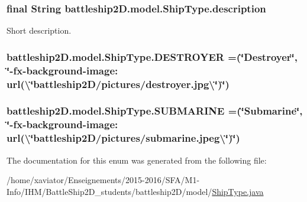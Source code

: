 \hypertarget{enumbattleship2D_1_1model_1_1ShipType_a99b2dcefbf9c3c0c210d2f7760d247ef}{
\subsubsection[{description}]{\setlength{\rightskip}{0pt plus 5cm}final String battleship2\-D.\-model.\-Ship\-Type.\-description\hspace{0.3cm}{\ttfamily [private]}}}\label{enumbattleship2D_1_1model_1_1ShipType_a99b2dcefbf9c3c0c210d2f7760d247ef}


Short description. 

\hypertarget{enumbattleship2D_1_1model_1_1ShipType_afb73a729348c4ae84ea2e4d2ff1160de}{
\subsubsection[{D\-E\-S\-T\-R\-O\-Y\-E\-R}]{\setlength{\rightskip}{0pt plus 5cm}battleship2\-D.\-model.\-Ship\-Type.\-D\-E\-S\-T\-R\-O\-Y\-E\-R =(\char`\"{}Destroyer\char`\"{}, \char`\"{}-\/fx-\/background-\/image\-: url(\textbackslash{}\char`\"{}battleship2\-D/pictures/destroyer.\-jpg\textbackslash{}\char`\"{})\char`\"{})}}\label{enumbattleship2D_1_1model_1_1ShipType_afb73a729348c4ae84ea2e4d2ff1160de}
\hypertarget{enumbattleship2D_1_1model_1_1ShipType_a6a4a2e419cb22ff18555e82539251a9d}{
\subsubsection[{S\-U\-B\-M\-A\-R\-I\-N\-E}]{\setlength{\rightskip}{0pt plus 5cm}battleship2\-D.\-model.\-Ship\-Type.\-S\-U\-B\-M\-A\-R\-I\-N\-E =(\char`\"{}Submarine\char`\"{}, \char`\"{}-\/fx-\/background-\/image\-: url(\textbackslash{}\char`\"{}battleship2\-D/pictures/submarine.\-jpeg\textbackslash{}\char`\"{})\char`\"{})}}\label{enumbattleship2D_1_1model_1_1ShipType_a6a4a2e419cb22ff18555e82539251a9d}


The documentation for this enum was generated from the following file\-:\begin{DoxyCompactItemize}
\item 
/home/xaviator/\-Enseignements/2015-\/2016/\-S\-F\-A/\-M1-\/\-Info/\-I\-H\-M/\-Battle\-Ship2\-D\-\_\-students/battleship2\-D/model/\hyperlink{ShipType_8java}{Ship\-Type.\-java}\end{DoxyCompactItemize}
